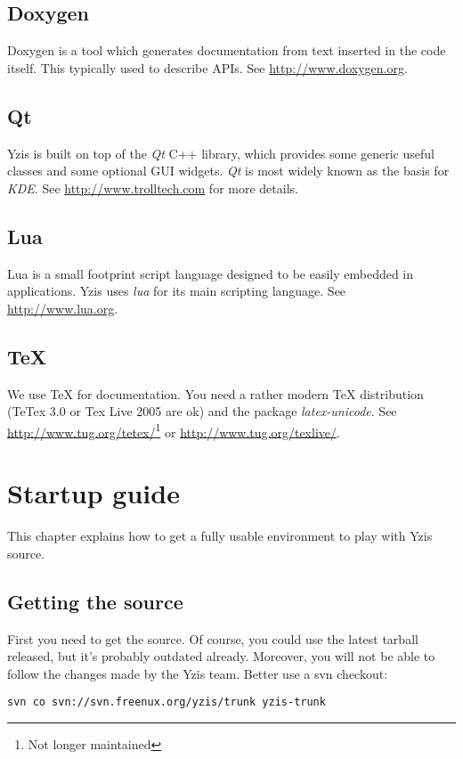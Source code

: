 \documentclass[a4paper,12pt]{report}
\begin{document}
\section{Doxygen}
Doxygen is a tool which generates documentation from text inserted in the
code itself. This typically used to describe APIs.
See \url{http://www.doxygen.org}.

\section{Qt}
Yzis is built on top of the \emph{Qt} C++ library, which provides some
generic useful classes and some optional GUI widgets. \emph{Qt} is most
widely known as the basis for \emph{KDE}.
See \url{http://www.trolltech.com} for more details.

\section{Lua}
Lua is a small footprint script language designed to be easily embedded in
applications. Yzis uses \emph{lua} for its main scripting language. See
\url{http://www.lua.org}.

\section{\TeX}
We use {\TeX} for documentation. You need a rather modern {\TeX} distribution
(TeTex 3.0 or Tex Live 2005 are ok) and the package \emph{latex-unicode}.
See \url{http://www.tug.org/tetex/}\footnote{Not longer
maintained} or \url{http://www.tug.org/texlive/}.

\chapter{Startup guide}
This chapter explains how to get a fully usable environment to play with
Yzis source.

\section{Getting the source}
\label{checkout}
First you need to get the source. Of course, you could use the latest
tarball released, but it's probably outdated already. Moreover, you will
not be able to follow the changes made by the Yzis team.
Better use a svn checkout:

\begin{verbatim}
svn co svn://svn.freenux.org/yzis/trunk yzis-trunk
\end{verbatim}
\end{document}

